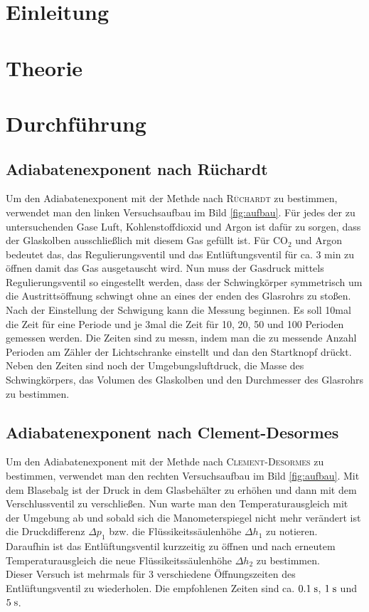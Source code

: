 \documentclass[12pt, a4paper, twoside]{scrartcl}
\newcommand{\person}[1]{\textsc{#1}}
\begin{document}

\cleardoublepage
\tableofcontents
\cleardoublepage
\setcounter{page}{1}

\section{Einleitung}
\label{sec:einleitung}

\section{Theorie}
\label{sec:theorie}


\section{Durchführung}
\label{sec:durchfuehrung}
\subsection{Adiabatenexponent nach Rüchardt}
Um den Adiabatenexponent mit der Methde nach \person{Rüchardt} zu bestimmen, verwendet man den linken Versuchsaufbau im Bild \ref{fig:aufbau}.
Für jedes der zu untersuchenden Gase Luft, Kohlenstoffdioxid und Argon ist dafür zu sorgen, dass der Glaskolben ausschließlich mit diesem Gas gefüllt ist.
Für CO$_2$ und Argon bedeutet das, das Regulierungsventil und das Entlüftungsventil für ca. 3 min zu öffnen damit das Gas ausgetauscht wird.
Nun muss der Gasdruck mittels Regulierungsventil so eingestellt werden, dass der Schwingkörper symmetrisch um die Austrittsöffnung schwingt ohne an eines der enden des Glasrohrs zu stoßen.\\
Nach der Einstellung der Schwigung kann die Messung beginnen. Es soll 10mal die Zeit für eine Periode und je 3mal die Zeit für 10, 20, 50 und 100 Perioden gemessen werden.
Die Zeiten sind zu messn, indem man die zu messende Anzahl Perioden am Zähler der Lichtschranke einstellt und dan den Startknopf drückt.\\
Neben den Zeiten sind noch der Umgebungsluftdruck, die Masse des Schwingkörpers, das Volumen des Glaskolben und den Durchmesser des Glasrohrs zu bestimmen.
\subsection{Adiabatenexponent nach Clement-Desormes}
Um den Adiabatenexponent mit der Methde nach \person{Clement-Desormes} zu bestimmen, verwendet man den rechten Versuchsaufbau im Bild \ref{fig:aufbau}.
Mit dem Blasebalg ist der Druck in dem Glasbehälter zu erhöhen und dann mit dem Verschlussventil zu verschließen.
Nun warte man den Temperaturausgleich mit der Umgebung ab und sobald sich die Manometerspiegel nicht mehr verändert ist die Druckdifferenz $\Delta p_1$ bzw. die Flüssikeitssäulenhöhe $\Delta h_1$ zu notieren.
Daraufhin ist das Entlüftungsventil kurzzeitig zu öffnen und nach erneutem Temperaturausgleich die neue Flüssikeitssäulenhöhe $\Delta h_2$ zu bestimmen.\\
Dieser Versuch ist mehrmals für 3 verschiedene Öffnungszeiten des Entlüftungsventil zu wiederholen. Die empfohlenen Zeiten sind ca. $0.1\mathrel{\rm s}$, $1\mathrel{\rm s}$ und $5\mathrel{\rm s}$.
\end{document}
